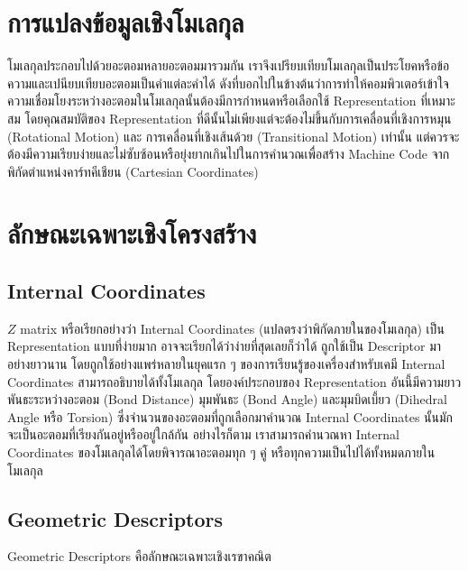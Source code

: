 \section{การแปลงข้อมูลเชิงโมเลกุล}

โมเลกุลประกอบไปด้วยอะตอมหลายอะตอมมารวมกัน เราจึงเปรียบเทียบโมเลกุลเป็นประโยคหรือข้อความและเปนียบเทียบอะตอมเป็นคำแต่ละคำได้
ดังที่บอกไปในข้างต้นว่าการทำให้คอมพิวเตอร์เข้าใจความเชื่อมโยงระหว่างอะตอมในโมเลกุลนั้นต้องมีการกำหนดหรือเลือกใช้ Representation ที่เหมาะสม
โดยคุณสมบัติของ Representation ที่ดีนั้นไม่เพียงแต่จะต้องไม่ขึ้นกับการเคลื่อนที่เชิงการหมุน (Rotational Motion) และ การเคลื่อนที่เชิงเส้นด้วย (Transitional Motion) เท่านั้น 
แต่ควรจะต้องมีความเรียบง่ายและไม่ซับซ้อนหรือยุ่งยากเกินไปในการคำนวณเพื่อสร้าง Machine Code จากพิกัดตำแหน่งคาร์ทคีเชียน (Cartesian Coordinates)

\section{ลักษณะเฉพาะเชิงโครงสร้าง}

\subsection{Internal Coordinates}

$Z$ matrix หรือเรียกอย่างว่า Internal Coordinates (แปลตรงว่าพิกัดภายในของโมเลกุล) เป็น Representation แบบที่ง่ายมาก 
อาจจะเรียกได้ว่าง่ายที่สุดเลยก็ว่าได้ ถูกใช้เป็น Descriptor มาอย่างยาวนาน โดยถูกใช้อย่างแพร่หลายในยุคแรก ๆ ของการเรียนรู้ของเครื่องสำหรับเคมี
Internal Coordinates สามารถอธิบายได้ทั้งโมเลกุล โดยองค์ประกอบของ Representation อันนี้มีความยาวพันธะระหว่างอะตอม (Bond Distance) 
มุมพันธะ (Bond Angle) และมุมบิดเบี้ยว (Dihedral Angle หรือ Torsion) ซึ่งจำนวนของอะตอมที่ถูกเลือกมาคำนวณ Internal Coordinates 
นั้นมักจะเป็นอะตอมที่เรียงกันอยู่หรืออยู่ใกล้กัน อย่างไรก็ตาม เราสามารถคำนวณหา Internal Coordinates ของโมเลกุลได้โดยพิจารณาอะตอมทุก ๆ คู่
หรือทุกความเป็นไปได้ทั้งหมดภายในโมเลกุล

\subsection{Geometric Descriptors}

Geometric Descriptors คือลักษณะเฉพาะเชิงเรขาคณิต

